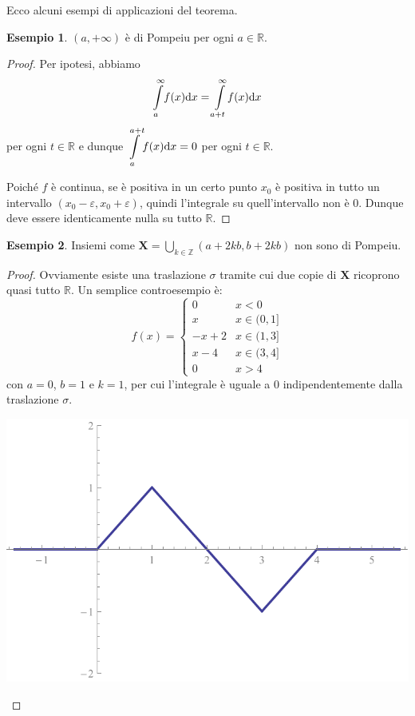 \documentclass[12pt]{article}
\newcommand\rea{\mathbb R}
\newcommand\ins[1]{\mathbf #1}
\newcommand\pom{di Pompeiu}
\newcommand\intex[3]{\int\limits_{#1}^{#2}\!#3(x)\text dx}
\theoremstyle{definition}
\newtheorem{esem}{Esempio}
\begin{document}
Ecco alcuni esempi di applicazioni del teorema.
\begin{esem}\label{esem:semiretta}
$(a,+\infty)$ è \pom{} per ogni $a\in\rea$.
\end{esem}
\begin{proof}
Per ipotesi, abbiamo \[\displaystyle\intex a\infty f=\intex{a+t}\infty f\] per ogni $t\in\rea$
e dunque $\displaystyle\intex a{a+t}f=0$ per ogni $t\in\rea$.

Poiché $f$ è continua, se è positiva in un certo punto $x_0$
è positiva in tutto un intervallo $(x_0-\varepsilon,x_0+\varepsilon)$, quindi
l'integrale su quell'intervallo non è $0$.
Dunque deve essere identicamente nulla su tutto $\rea$.
\end{proof}

\begin{esem}Insiemi come $\displaystyle\ins X=\bigcup_{k\in\mathbb Z}(a+2kb,b+2kb)$ non sono \pom{}.
\end{esem}
\begin{proof}Ovviamente esiste una traslazione $\sigma$
tramite cui due copie di $\ins X$ ricoprono quasi tutto $\rea$.
Un semplice controesempio è:
\begin{equation*}
f(x)=\left\{\begin{matrix}
0 & x<0 \\ 
x & x\in(0,1]\\
-x+2 & x\in(1,3]\\
x-4 & x\in(3,4]\\
0 & x>4
\end{matrix}\right.
\end{equation*}
con $a=0$, $b=1$ e $k=1$, per cui l'integrale è uguale a $0$ indipendentemente dalla traslazione $\sigma$.
\begin{center}
\includegraphics*[scale=0.8]{ex1.pdf}
\end{center}
\end{proof}
\end{document}
